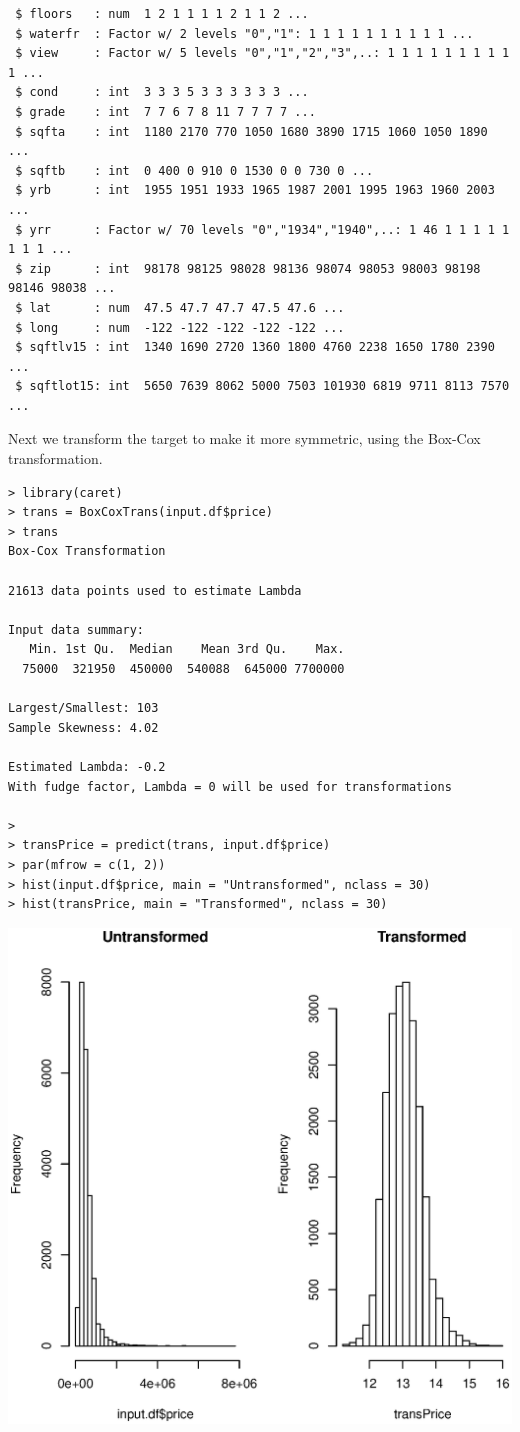 \documentclass{article}%
\begin{document}
\begin{verbatim}
 $ floors   : num  1 2 1 1 1 1 2 1 1 2 ...
 $ waterfr  : Factor w/ 2 levels "0","1": 1 1 1 1 1 1 1 1 1 1 ...
 $ view     : Factor w/ 5 levels "0","1","2","3",..: 1 1 1 1 1 1 1 1 1 1 ...
 $ cond     : int  3 3 3 5 3 3 3 3 3 3 ...
 $ grade    : int  7 7 6 7 8 11 7 7 7 7 ...
 $ sqfta    : int  1180 2170 770 1050 1680 3890 1715 1060 1050 1890 ...
 $ sqftb    : int  0 400 0 910 0 1530 0 0 730 0 ...
 $ yrb      : int  1955 1951 1933 1965 1987 2001 1995 1963 1960 2003 ...
 $ yrr      : Factor w/ 70 levels "0","1934","1940",..: 1 46 1 1 1 1 1 1 1 1 ...
 $ zip      : int  98178 98125 98028 98136 98074 98053 98003 98198 98146 98038 ...
 $ lat      : num  47.5 47.7 47.7 47.5 47.6 ...
 $ long     : num  -122 -122 -122 -122 -122 ...
 $ sqftlv15 : int  1340 1690 2720 1360 1800 4760 2238 1650 1780 2390 ...
 $ sqftlot15: int  5650 7639 8062 5000 7503 101930 6819 9711 8113 7570 ...
\end{verbatim}
Next we transform the target to make it more symmetric, using the Box-Cox transformation.
\begin{verbatim}
> library(caret)
> trans = BoxCoxTrans(input.df$price)
> trans
Box-Cox Transformation

21613 data points used to estimate Lambda

Input data summary:
   Min. 1st Qu.  Median    Mean 3rd Qu.    Max. 
  75000  321950  450000  540088  645000 7700000 

Largest/Smallest: 103 
Sample Skewness: 4.02 

Estimated Lambda: -0.2 
With fudge factor, Lambda = 0 will be used for transformations

> 
> transPrice = predict(trans, input.df$price)
> par(mfrow = c(1, 2))
> hist(input.df$price, main = "Untransformed", nclass = 30)
> hist(transPrice, main = "Transformed", nclass = 30)
\end{verbatim}
\includegraphics[width=\textwidth]{Symmetric.eps}
\end{document}
